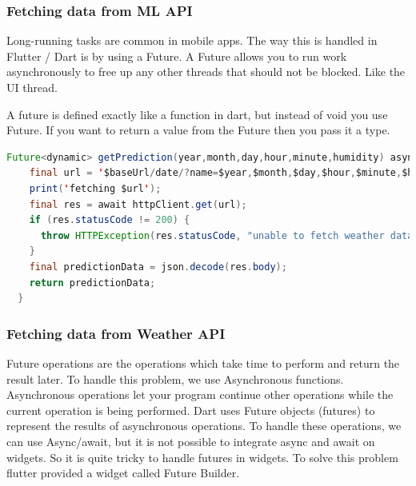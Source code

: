 \subsubsection{Fetching data from ML API}
Long-running tasks are common in mobile apps. The way this is handled in Flutter / Dart is by using a Future. A Future allows you to run work asynchronously to free up any other threads that should not be blocked. Like the UI thread.

A future is defined exactly like a function in dart, but instead of void you use Future. If you want to return a value from the Future then you pass it a type.

\begin{lstlisting}[language=java, caption = Getting data from ML API to flutter UI]
Future<dynamic> getPrediction(year,month,day,hour,minute,humidity) async{
    final url = '$baseUrl/date/?name=$year,$month,$day,$hour,$minute,$humidity';
    print('fetching $url');
    final res = await httpClient.get(url);
    if (res.statusCode != 200) {
      throw HTTPException(res.statusCode, "unable to fetch weather data");
    }
    final predictionData = json.decode(res.body);
    return predictionData;
  }
\end{lstlisting}

\subsubsection{Fetching data from Weather API}

Future operations are the operations which take time to perform and return the result later. To handle this problem, we use Asynchronous functions. Asynchronous operations let your program continue other operations while the current operation is being performed. Dart uses Future objects (futures) to represent the results of asynchronous operations. To handle these operations, we can use Async/await, but it is not possible to integrate async and await on widgets. So it is quite tricky to handle futures in widgets. To solve this problem flutter provided a widget called Future Builder.

